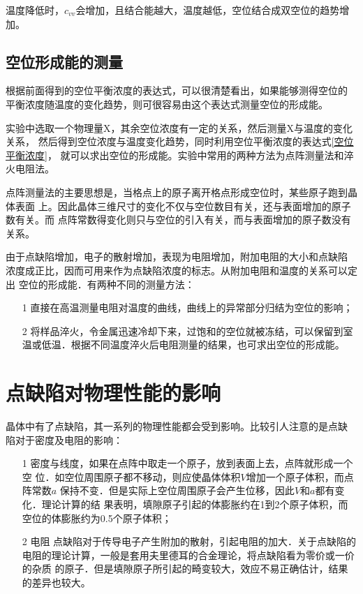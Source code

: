             温度降低时，$c_{vv}$会增加，且结合能越大，温度越低，空位结合成双空位的趋势增加。
        
        \subsection{空位形成能的测量}
        根据前面得到的空位平衡浓度的表达式，可以很清楚看出，如果能够测得空位的
        平衡浓度随温度的变化趋势，则可很容易由这个表达式测量空位的形成能。

        实验中选取一个物理量X，其余空位浓度有一定的关系，然后测量X与温度的变化关系，
        然后得到空位浓度与温度变化趋势，同时利用空位平衡浓度的表达式\autoref{空位平衡浓度}，
        就可以求出空位的形成能。实验中常用的两种方法为点阵测量法和淬火电阻法。

        点阵测量法的主要思想是，当格点上的原子离开格点形成空位时，某些原子跑到晶体表面
        上。因此晶体三维尺寸的变化不仅与空位数目有关，还与表面增加的原子数有关。而
        点阵常数得变化则只与空位的引入有关，而与表面增加的原子数没有关系。

        由于点缺陷增加，电子的散射增加，表现为电阻增加，附加电阻的大小和点缺陷
        浓度成正比，因而可用来作为点缺陷浓度的标志。从附加电阻和温度的关系可以定出
        空位的形成能．有两种不同的测量方法：
        \begin{itemize}
            \item[1] 直接在高温测量电阻对温度的曲线，曲线上的异常部分归结为空位的影响；
            \item[2] 将样品淬火，令金属迅速冷却下来，过饱和的空位就被冻结，可以保留到室温或低温．根据不同温度淬火后电阻测量的结果，也可求出空位的形成能。
        \end{itemize}

    \section{点缺陷对物理性能的影响}
        晶体中有了点缺陷，其一系列的物理性能都会受到影响。比较引人注意的是点缺
        陷对于密度及电阻的影响：
        \begin{enumerate}
            \item[1] 密度与线度，如果在点阵中取走一个原子，放到表面上去，点阵就形成一个空
                    位．如空位周围原子都不移动，则应使晶体体积$V$增加一个原子体积，而点阵常数$a$
                    保持不变．但是实际上空位周围原子会产生位移，因此$V$和$a$都有变化．理论计算的结
                    果表明，填隙原子引起的体膨胀约在1到2个原子体积，而空位的体膨胀约为0.5个原子体积；
            \item[2]  电阻 点缺陷对于传导电子产生附加的散射，引起电阻的加大．关于点缺陷的
            电阻的理论计算，一般是套用夫里德耳的合金理论，将点缺陷看为零价或一价的杂质
            的原子．但是填隙原子所引起的畸变较大，效应不易正确估计，结果的差异也较大。
        \end{enumerate}
    
